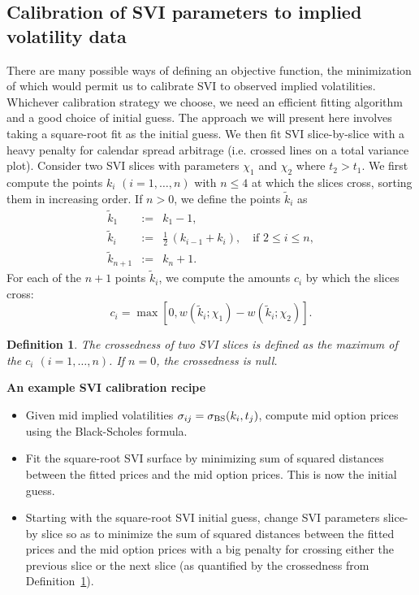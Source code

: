 \documentclass[12pt]{article}
\newtheorem{definition}{Definition}[section]
\numberwithin{equation}{section}
\newcommand{\BS}{\rm BS}
\newcommand{\beas}{\begin{eqnarray*}}
\newcommand{\eeas}{\end{eqnarray*}}
\begin{document}
\subsection{Calibration of SVI parameters to implied volatility data}\label{sec:fitting}

There are many possible ways of defining an objective function, the minimization of which would permit us to calibrate SVI to observed implied volatilities.  Whichever calibration strategy we choose, we need an efficient fitting algorithm and a good choice of initial guess.
The approach we will present here involves taking a square-root fit as the initial guess.  We then fit SVI slice-by-slice with a heavy penalty for calendar spread arbitrage (i.e. crossed lines on a total variance plot).
Consider two SVI slices with parameters $\chi_1$ and $\chi_2$ where $t_2>t_1$.  
We first compute the points $k_i$ $(i=1,\ldots,n)$ with $n\leq 4$ at which the slices cross, sorting them in increasing order.  If $n>0$, we define the points $\widetilde k_i$ as
\beas
\widetilde k_1&:=&k_1-1,\\
\widetilde k_i&:=&\frac 12\,(k_{i-1}+k_{i}),\quad \text{if } 2 \leq i \leq n, \\
\widetilde k_{n+1}&:=&k_n+1.
\eeas
For each of the $n+1$ points $\widetilde k_i$, we compute the amounts $c_i$ by which the slices cross:
\[
c_i=\max\left[0,w(\widetilde k_i;\chi_1)-w(\widetilde k_i;\chi_2)\right].
\]


\begin{definition}\label{def:crossedness}
The {\em crossedness} of two SVI slices is defined as the maximum of the $c_i$ $ (i=1,\ldots,n)$.  
If $n=0$, the crossedness is null.
\end{definition}

\begin{center}
\colorbox{shade}{\begin{minipage}[h!]{0.95\textwidth}

\begin{center}
{\bf An example SVI calibration recipe}
\end{center}

\begin{itemize}
\item Given mid implied volatilities $\sigma_{ij}=\sigma_{\BS}(k_i,t_j)$, compute mid option prices using the Black-Scholes formula.
\item Fit the square-root SVI surface by minimizing sum of squared distances between the fitted prices and the mid option prices.   This is now the initial guess.
\item Starting with the square-root SVI initial guess, change SVI parameters slice-by slice so as to minimize the  sum of squared distances between the fitted prices and the mid option prices with a big penalty for crossing either the previous slice or the next slice (as quantified by the crossedness from Definition~\ref{def:crossedness}).
\end{itemize}
\end{minipage}}
\end{center}
\end{document}
